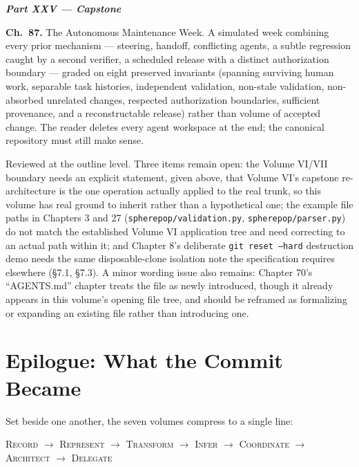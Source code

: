 \documentclass[11pt]{book}
\newcommand{\subheading}[1]{\bigskip\noindent{\bfseries\itshape #1}\smallskip\par}
\newcommand{\chapentry}[2]{\noindent\textbf{Ch.~#1.} #2\par\smallskip}
\newcommand{\partheading}[1]{\bigskip\noindent\textbf{\textit{#1}}\smallskip\par}
\begin{document}
\partheading{Part XXV --- Capstone}
\chapentry{87}{The Autonomous Maintenance Week. A simulated week combining every prior mechanism --- steering, handoff, conflicting agents, a subtle regression caught by a second verifier, a scheduled release with a distinct authorization boundary --- graded on eight preserved invariants (spanning surviving human work, separable task histories, independent validation, non-stale validation, non-absorbed unrelated changes, respected authorization boundaries, sufficient provenance, and a reconstructable release) rather than volume of accepted change. The reader deletes every agent workspace at the end; the canonical repository must still make sense.}

\subheading{Status and Open Items}
Reviewed at the outline level. Three items remain open: the Volume VI/VII boundary needs an explicit statement, given above, that Volume VI's capstone re-architecture is the one operation actually applied to the real trunk, so this volume has real ground to inherit rather than a hypothetical one; the example file paths in Chapters 3 and 27 (\texttt{spherepop/validation.py}, \texttt{spherepop/parser.py}) do not match the established Volume VI application tree and need correcting to an actual path within it; and Chapter 8's deliberate \texttt{git reset --hard} destruction demo needs the same disposable-clone isolation note the specification requires elsewhere (\S7.1, \S7.3). A minor wording issue also remains: Chapter 70's ``AGENTS.md'' chapter treats the file as newly introduced, though it already appears in this volume's opening file tree, and should be reframed as formalizing or expanding an existing file rather than introducing one.

\chapter*{Epilogue: What the Commit Became}

\subheading{The Compression}

Set beside one another, the seven volumes compress to a single line:

\begin{center}
\textsc{Record} $\to$ \textsc{Represent} $\to$ \textsc{Transform} $\to$ \textsc{Infer} $\to$ \textsc{Coordinate} $\to$ \textsc{Architect} $\to$ \textsc{Delegate}
\end{center}
\end{document}
